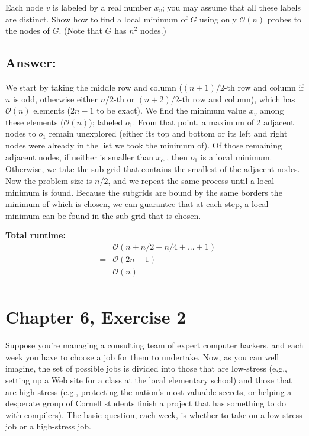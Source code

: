\documentclass[12pt, letterpaper]{article}
\begin{document}
Each node $v$ is labeled by a real number $x_v$; you may assume that all these labels are distinct. Show how to find a local minimum of $G$ using only $\mathcal{O}(n)$ probes to the nodes of $G$. (Note that $G$ has $n^2$ nodes.)


\clearpage
\subsection*{Answer:}
We start by taking the middle row and column ($(n+1)/2$-th row and column if $n$ is odd, otherwise either $n/2$-th or $(n+2)/2$-th row and column), which has $\mathcal{O}(n)$ elements ($2n - 1$ to be exact).
We find the minimum value $x_v$ among these elements ($\mathcal{O}(n)$); labeled $o_1$. 
From that point, a maximum of 2 adjacent nodes to $o_1$ remain unexplored (either its top and bottom or its left and right nodes were already in the list we took the minimum of).
Of those remaining adjacent nodes, if neither is smaller than $x_{o_1}$, then $o_1$ is a local minimum.
Otherwise, we take the sub-grid that contains the smallest of the adjacent nodes.
Now the problem size is $n / 2$, and we repeat the same process until a local minimum is found.
Because the subgrids are bound by the same borders the minimum of which is chosen, 
we can guarantee that at each step, a local minimum can be found in the sub-grid that is chosen.


\vspace{5mm}
\noindent\textbf{Total runtime:}
\begin{align*}
    && \mathcal{O}(n + n / 2 + n / 4 + ... + 1)\\
    &=& \mathcal{O}(2n - 1) \\
    &=& \mathcal{O}(n) \\
\end{align*}



\clearpage
\section{Chapter 6, Exercise 2}
Suppose you're managing a consulting team of expert computer hackers, and each week you have to choose a job for them to undertake. 
Now, as you can well imagine, the set of possible jobs is divided into those that are low-stress (e.g., setting up a Web site for a class at the local elementary school) 
and those that are high-stress (e.g., protecting the nation's most valuable secrets, 
or helping a desperate group of Cornell students finish a project that has something to do with compilers). 
The basic question, each week, is whether to take on a low-stress job or a high-stress job.
\end{document}
